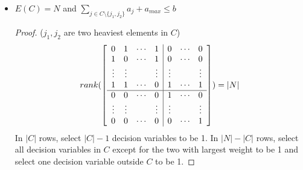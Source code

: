 \begin{itemize}
                    \item $E(C) = N$ and $\sum_{j\in C \setminus \{j_1, j_2\}} a_j + a_{max} \le b$
                        \begin{proof}
                             ($j_1, j_2$ are two heaviest elements in $C$)
                            \begin{equation*}
                                rank(\left[\begin{array}{c c c c | c c c}
                                    0 & 1 & \cdots & 1 & 0 & \cdots & 0 \\
                                    1 & 0 & \cdots & 1 & 0 & \cdots & 0 \\
                                    \vdots & \vdots & & \vdots & \vdots & & \vdots\\
                                    1 & 1 & \cdots & 0 & 1 & \cdots & 1 \\
                                    \hline
                                    0 & 0 & \cdots & 0 & 1 & \cdots & 0 \\
                                    \vdots & \vdots & & \vdots & \vdots & & \vdots\\
                                    0 & 0 & \cdots & 0 & 0 & \cdots & 1
                                    \end{array}\right]) = |N|
                            \end{equation*}
                            In $|C|$ rows, select $|C| - 1$ decision variables to be 1. In $|N| - |C|$ rows, select all decision variables in $C$ except for the two with largest weight to be 1 and select one decision variable outside $C$ to be 1.
                        \end{proof} 


\end{itemize}

